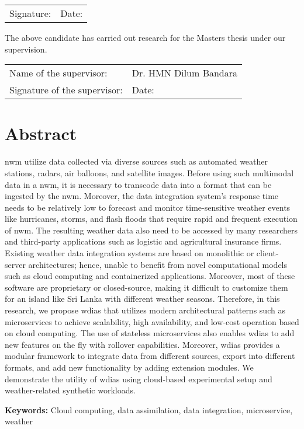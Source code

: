 \documentclass[a4paper,oneside,12pt]{report}
\begin{document}
\vspace{0.5in}
\noindent
\begin{tabu} to 1.0\textwidth { X[6.5,l] X[3.5,l] }
  Signature: & Date:
\end{tabu}



\vspace{0.5in}
\noindent
The above candidate has carried out research for the Masters thesis under our supervision.


\vspace{0.5in}
\noindent
\begin{tabu} to 1.0\textwidth { X[6.5,l] X[3.5,l] }
  Name of the supervisor: & Dr. HMN Dilum Bandara\\ [2.5ex]
  Signature of the supervisor: & Date:
\end{tabu}

\restoregeometry
\normalsize

{ 

\chapter*{Abstract}

\acrfull{nwm} utilize data collected via diverse sources such as automated weather stations, radars, air balloons, and satellite images. Before using such multimodal data in a \acrshort{nwm}, it is necessary to transcode data into a format that can be ingested by the \acrshort{nwm}. Moreover, the data integration system's response time needs to be relatively low to forecast and monitor time-sensitive weather events like hurricanes, storms, and flash floods that require rapid and frequent execution of \acrshort{nwm}. The resulting weather data also need to be accessed by many researchers and third-party applications such as logistic and agricultural insurance firms.
Existing weather data integration systems are based on monolithic or client-server architectures; hence, unable to benefit from novel computational models such as cloud computing and containerized applications. Moreover, most of these software are proprietary or closed-source, making it difficult to customize them for an island like Sri Lanka with different weather seasons.
Therefore, in this research, we propose \acrfull{wdias} that utilizes modern architectural patterns such as microservices to achieve scalability, high availability, and low-cost operation based on cloud computing. The use of stateless microservices also enables \acrshort{wdias} to add new features on the fly with rollover capabilities. Moreover, \acrshort{wdias} provides a modular framework to integrate data from different sources, export into different formats, and add new functionality by adding extension modules.
We demonstrate the utility of \acrshort{wdias} using cloud-based experimental setup and weather-related synthetic workloads.

\vspace{4mm}

\textbf{Keywords:} Cloud computing, data assimilation, data integration, microservice, weather
}
\end{document}
